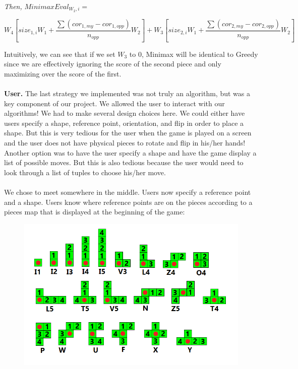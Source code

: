 \documentclass[11pt]{article}
\begin{document}
{\it Then,} $MinimaxEval_{W_2, i} =$

\begin{center} $W_4 \left [ size_{1,i} W_1 + \dfrac{\sum{(cor_{1,my} - cor_{1,opp})}}{n_{opp}} W_2 \right ]
+ W_3 \left [ size_{2,i} W_1 + \dfrac{\sum{(cor_{2,my} - cor_{2,opp})}}{n_{opp}} W_2 \right ]$ \end{center}

\bigskip

\noindent Intuitively, we can see that if we set $W_3$ to $0$, Minimax will be identical to Greedy since we are effectively ignoring the score of the second piece and only maximizing over the score of the first.
\\\\
{\bf User.} The last strategy we implemented was not truly an algorithm, but was a key component of our project. We allowed the user to interact with our algorithms! We had to make several design choices here. We could either have users specify a shape, reference point, orientation, and flip in order to place a shape. But this is very tedious for the user when the game is played on a screen and the user does not have physical pieces to rotate and flip in his/her hands! Another option was to have the user specify a shape and have the game display a list of possible moves. But this is also tedious because the user would need to look through a list of tuples to choose his/her move.
\\\\
We chose to meet somewhere in the middle. Users now specify a reference point and a shape. Users know where reference points are on the pieces according to a pieces map that is displayed at the beginning of the game:

\begin{figure}[h]
\begin{center}
\includegraphics[scale = 0.65]{Blokus_Tiles.png}
\end{center}
\end{figure}
\end{document}
